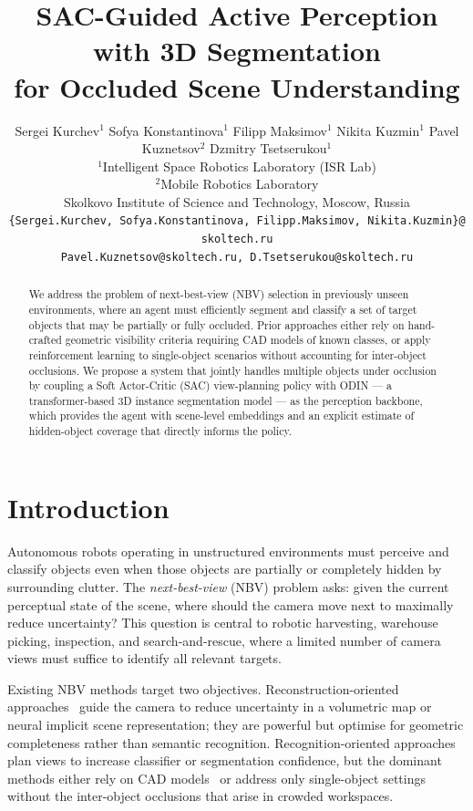\documentclass{article}
\title{SAC-Guided Active Perception with 3D Segmentation\\
       for Occluded Scene Understanding}
\author{
  Sergei Kurchev$^{1}$ \And
  Sofya Konstantinova$^{1}$ \And
  Filipp Maksimov$^{1}$ \And
  Nikita Kuzmin$^{1}$ \AND
  Pavel Kuznetsov$^{2}$ \And
  Dzmitry Tsetserukou$^{1}$ \\[4pt]
  $^{1}$Intelligent Space Robotics Laboratory (ISR Lab) \\
  $^{2}$Mobile Robotics Laboratory \\
  Skolkovo Institute of Science and Technology, Moscow, Russia \\[2pt]
  \texttt{\{Sergei.Kurchev,\ Sofya.Konstantinova,\ Filipp.Maksimov,\ Nikita.Kuzmin\}@skoltech.ru} \\
  \texttt{Pavel.Kuznetsov@skoltech.ru,\ D.Tsetserukou@skoltech.ru}
}
\begin{document}
\maketitle

\begin{abstract}
We address the problem of next-best-view (NBV) selection in previously unseen environments, where an agent must efficiently segment and classify a set of target objects that may be partially or fully occluded. Prior approaches either rely on hand-crafted geometric visibility criteria requiring CAD models of known classes, or apply reinforcement learning to single-object scenarios without accounting for inter-object occlusions. We propose a system that jointly handles multiple objects under occlusion by coupling a Soft Actor-Critic (SAC) view-planning policy with ODIN --- a transformer-based 3D instance segmentation model --- as the perception backbone, which provides the agent with scene-level embeddings and an explicit estimate of hidden-object coverage that directly informs the policy.
\end{abstract}


\section{Introduction}

Autonomous robots operating in unstructured environments must perceive and classify objects even when those objects are partially or completely hidden by surrounding clutter. The \emph{next-best-view} (NBV) problem asks: given the current perceptual state of the scene, where should the camera move next to maximally reduce uncertainty? This question is central to robotic harvesting, warehouse picking, inspection, and search-and-rescue, where a limited number of camera views must suffice to identify all relevant targets.

Existing NBV methods target two objectives. Reconstruction-oriented approaches~\citep{hornung2013octomap,gennbv2024,uncertainty_driven,activenerf2022} guide the camera to reduce uncertainty in a volumetric map or neural implicit scene representation; they are powerful but optimise for geometric completeness rather than semantic recognition. Recognition-oriented approaches~\citep{wang2019active,denzler2002information,scott2003view,nbv_rl_classification} plan views to increase classifier or segmentation confidence, but the dominant methods either rely on CAD models~\citep{wang2019active} or address only single-object settings~\citep{nbv_rl_classification} without the inter-object occlusions that arise in crowded workspaces.
\end{document}
